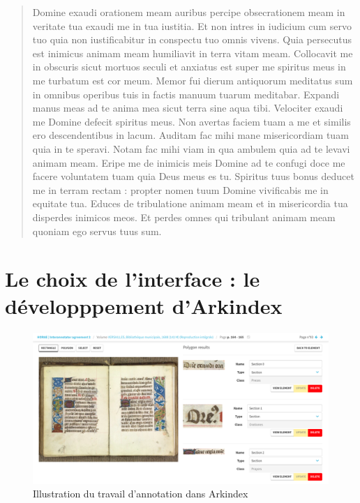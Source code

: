 \documentclass[a4paper,12pt,twoside]{book}
\begin{document}
\begin{quotation}
Domine exaudi orationem meam auribus percipe obsecrationem meam in veritate tua exaudi me in tua iustitia.
Et non intres in iudicium cum servo tuo quia non iustificabitur in conspectu tuo omnis vivens.
Quia persecutus est inimicus animam meam humiliavit in terra vitam meam. 
Collocavit me in obscuris sicut mortuos seculi et anxiatus est super me spiritus meus in me turbatum est cor meum.
Memor fui dierum antiquorum meditatus sum in omnibus operibus tuis in factis manuum tuarum meditabar.
Expandi manus meas ad te anima mea sicut terra sine aqua tibi.
Velociter exaudi me Domine defecit spiritus meus. 
Non avertas faciem tuam a me et similis ero descendentibus in lacum.
Auditam fac mihi mane misericordiam tuam quia in te speravi. 
Notam fac mihi viam in qua ambulem quia ad te levavi animam meam.
Eripe me de inimicis meis Domine ad te confugi doce me facere voluntatem tuam quia Deus meus es tu. 
Spiritus tuus bonus deducet me in terram rectam : propter nomen tuum Domine vivificabis me in equitate tua. 
Educes de tribulatione animam meam et in misericordia tua disperdes inimicos meos. 
Et perdes omnes qui tribulant animam meam quoniam ego servus tuus sum.
	\end{quotation}
	
	\section{Le choix de l'interface : le développpement d'Arkindex}
	
	\begin{figure}[!h]
    \centering
    \includegraphics[width=15cm]{img/ML/Annotation_Arkindex.png}
    \caption{Illustration du travail d'annotation dans Arkindex}
    \end{figure}
    
\end{document}
